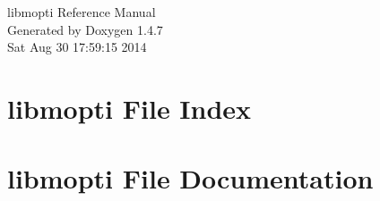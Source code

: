 \documentclass[letterpaper]{book}
\begin{document}
\begin{titlepage}
\vspace*{7cm}
\begin{center}
{\Large libmopti Reference Manual}\\
\vspace*{1cm}
{\large Generated by Doxygen 1.4.7}\\
\vspace*{0.5cm}
{\small Sat Aug 30 17:59:15 2014}\\
\end{center}
\end{titlepage}
\clearemptydoublepage
{}
\tableofcontents
\clearemptydoublepage
{}
\chapter{libmopti File Index}

\chapter{libmopti File Documentation}


\printindex
\end{document}
